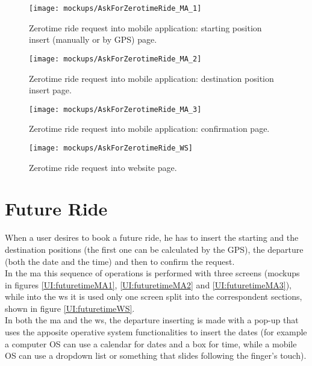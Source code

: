\documentclass[\mainpath/main]{subfiles}
\begin{document}
\begin{figure}[ht!]
	\centering
	\begin{minipage}[t]{0.4\textwidth}
		\centering
		\texttt{[image: mockups/AskForZerotimeRide\_MA\_1]}
		\caption[Zerotime ride request part1 into mobile application.]{Zerotime ride request into mobile application: starting position insert (manually or by GPS) page.}
		\label{UI:zerotimeMA1}
	\end{minipage}
	\hspace{1 cm}
	\begin{minipage}[t]{0.40\linewidth}
		\centering
		\texttt{[image: mockups/AskForZerotimeRide\_MA\_2]}
		\caption[Zerotime ride request part2 into mobile application.]{Zerotime ride request into mobile application: destination position insert page.}
		\label{UI:zerotimeMA2}
	\end{minipage}
\end{figure}

\begin{figure}[ht!]
	\centering
	\begin{minipage}[t]{0.4\textwidth}
		\centering
		\texttt{[image: mockups/AskForZerotimeRide\_MA\_3]}
		\caption[Zerotime ride request part3 into mobile application.]{Zerotime ride request into mobile application: confirmation page.}
		\label{UI:zerotimeMA3}
	\end{minipage}
	\hspace{1 cm}
	\begin{minipage}[t]{0.40\linewidth}
		\centering
		\texttt{[image: mockups/AskForZerotimeRide\_WS]}
		\caption[Zerotime ride request into website.]{Zerotime ride request into website page.}
		\label{UI:zerotimeWS}
	\end{minipage}
\end{figure}

\clearpage

\section{Future Ride}
\label{UI:FutureRide}
When a user desires to book a future ride, he has to insert the starting and the destination positions (the first one can be calculated by the GPS), the departure (both the date and the time) and then to confirm the request.\\
In the \gls{ma} this sequence of operations is performed with three screens (\glspl{mockup} in figures \ref{UI:futuretimeMA1}, \ref{UI:futuretimeMA2} and \ref{UI:futuretimeMA3}), while into the \gls{ws} it is used only one screen split into the correspondent sections, shown in figure \ref{UI:futuretimeWS}.\\
In both the \gls{ma} and the \gls{ws}, the departure inserting is made with a pop-up that uses the apposite operative system functionalities to insert the dates (for example a computer OS can use a calendar for dates and a box for time, while a mobile OS can use a dropdown list or something that slides following the finger's touch).\\
\end{document}
